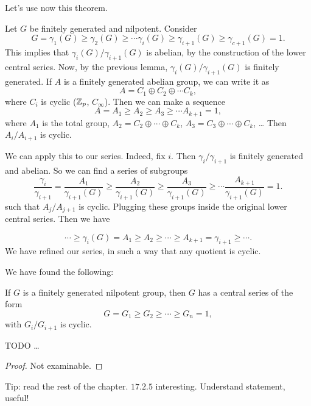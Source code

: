 Let's use now this theorem.


    Let $G$ be finitely generated and nilpotent.
    Consider 
    \[
        G = \gamma_1(G) \ge  \gamma_2(G) \ge  \cdots \gamma_i(G) \ge  \gamma_{i+1}(G) \ge  \gamma_{c+1}(G) = 1
    .\] 
    This implies that $\gamma_i(G) / \gamma_{i+1}(G)$ is abelian, by the construction of the lower central series.
    Now, by the previous lemma, $\gamma_i(G) / \gamma_{i+1}(G)$ is finitely generated.
    If $A$ is a finitely generated abelian group, we can write it as
    \[
    A = C_1 \oplus C_2 \oplus \cdots C_k
    ,\] 
    where $C_i$ is cyclic ($\mathbb{Z}_p$,  $C_{\infty}$).
    Then we can make a sequence
    \[
    A = A_1 \ge  A_2 \ge  A_3 \ge  \cdots A_{k+1} = 1
    ,\] 
    where $ A_1$ is the total group, $ A_2 = C_2 \oplus \cdots \oplus C_k$, $ A_3 = C_3 \oplus \cdots \oplus C_k$, \ldots
    Then $A_i / A_{i+1}$ is cyclic.

    We can apply this to our series.
    Indeed, fix $i$. Then $\gamma_i / \gamma_{i+1}$ is finitely generated and abelian. So we can find a series of subgroups
    \[
        \frac{\gamma_i}{\gamma_{i+1}} =
        \frac{A_1}{\gamma_{i+1}(G)} \ge  
        \frac{A_2}{\gamma_{i+1}(G)} \ge  
        \frac{A_3}{\gamma_{i+1}(G)} \ge   \cdots
        \frac{A_{k+1}}{\gamma_{i+1}(G)}  = 1
    .\] 
    such that $A_j / A_{j+1}$ is cyclic.
    Plugging these groups inside the original lower central series.
    Then we have

    \[
        \cdots \ge  \gamma_{i}(G) = A_1 \ge  A_2 \ge  \cdots \ge  A_{k+1} = \gamma_{i+1} \ge  \cdots
    .\] 
    We have refined our series,
    in such a way that any quotient is cyclic.

    We have found the following:

\begin{prop}
    If $G$ is a finitely generated nilpotent group, then $G$ has a central series of the form
    \[
        G = G_1 \ge  G_2 \ge  \cdots \ge  G_n  = 1,
    \]
    with $G_{i} / G_{i+1}$ is cyclic.
\end{prop}

\begin{prop}
    TODO \ldots
\end{prop}

\begin{proof}
    Not examinable.
\end{proof}

Tip: read the rest of the chapter. $17.2.5$ interesting. Understand statement, useful!


